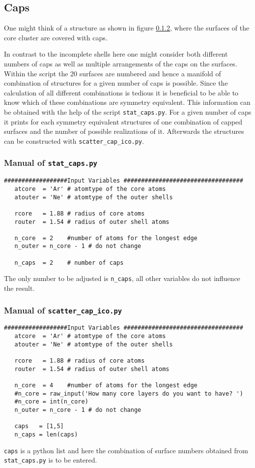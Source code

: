 \subsection{Caps}
One might think of a structure as shown in figure \ref{}, where the
surfaces of the core cluster are covered with caps.

In contrast to the incomplete shells here one might consider both different
numbers of caps as well as multiple arrangements of the caps on the surfaces.
Within the script the 20 surfaces are numbered and hence a manifold of
combination of structures for a given number of caps is possible.
Since the calculation of all different combinations is tedious
it is beneficial to be able to know which of these combinations are symmetry
equivalent. This information can be obtained with the help of the script
\lstinline|stat_caps.py|. For a given number of caps it prints for each
symmetry equivalent structures of one combination of capped surfaces
and the number of possible realizations of it. Afterwards the structures
can be constructed with \lstinline|scatter_cap_ico.py|.

\subsubsection{Manual of \lstinline|stat_caps.py|}
\begin{lstlisting}
##################Input Variables ##################################
   atcore  = 'Ar' # atomtype of the core atoms
   atouter = 'Ne' # atomtype of the outer shells
   
   rcore   = 1.88 # radius of core atoms
   router  = 1.54 # radius of outer shell atoms
   
   n_core  = 2    #number of atoms for the longest edge
   n_outer = n_core - 1 # do not change
   
   n_caps  = 2    # number of caps
\end{lstlisting}
The only number to be adjusted is \lstinline|n_caps|, all other variables
do not influence the result.


\subsubsection{Manual of \lstinline|scatter_cap_ico.py|}
\begin{lstlisting}
##################Input Variables ##################################
   atcore  = 'Ar' # atomtype of the core atoms
   atouter = 'Ne' # atomtype of the outer shells
   
   rcore   = 1.88 # radius of core atoms
   router  = 1.54 # radius of outer shell atoms
   
   n_core  = 4    #number of atoms for the longest edge
   #n_core = raw_input('How many core layers do you want to have? ')
   #n_core = int(n_core)
   n_outer = n_core - 1 # do not change
   
   caps   = [1,5]
   n_caps = len(caps)
\end{lstlisting}
\lstinline|caps| is a python list and here the combination of surface
numbers obtained from \lstinline|stat_caps.py| is to be entered.



